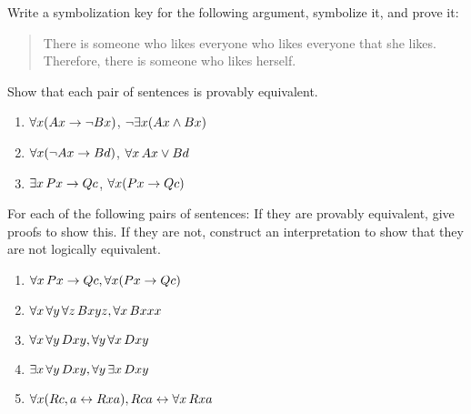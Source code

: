 \problempart
\label{pr.likes}
Write a symbolization key for the following argument, symbolize it, and prove it:
\begin{quote}
There is someone who likes everyone who likes everyone that she likes. Therefore, there is someone who likes herself.
\end{quote}


\problempart
Show that each pair of sentences is provably equivalent.
\begin{enumerate}
\item $\forall x (\mathord{A}x\rightarrow \neg \mathord{B}x)$, $\neg\exists x(\mathord{A}x \wedge \mathord{B}x)$
\item $\forall x (\neg\mathord{A}x\rightarrow \mathord{B}d)$, $\forall x\,\mathord{A}x \vee \mathord{B}d$
\item $\exists x\,\mathord{P}x \rightarrow \mathord{Q}c$, $\forall x (\mathord{P}x \rightarrow \mathord{Q}c)$
\end{enumerate}

\problempart
\label{pr.FOLequivornot}
For each of the following pairs of sentences: If they are provably equivalent, give proofs to show this. If they are not, construct an interpretation to show that they are not logically equivalent.
\begin{enumerate}
\item $\forall x\,\mathord{P}x \rightarrow \mathord{Q}c, \forall x (\mathord{P}x \rightarrow \mathord{Q}c)$
\item $\forall x\,\forall y\, \forall z\,\mathord{B}xyz, \forall x\,\mathord{B}xxx$
\item $\forall x\,\forall y\,\mathord{D}xy, \forall y\,\forall x\,\mathord{D}xy$
\item $\exists x\,\forall y\,\mathord{D}xy, \forall y\,\exists x\,\mathord{D}xy$
\item $\forall x (\mathord{R}c,a \leftrightarrow \mathord{R}xa), \mathord{R}ca \leftrightarrow \forall x\,\mathord{R}xa$
\end{enumerate}

